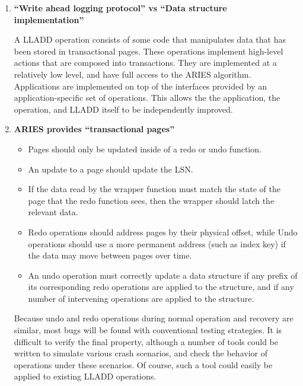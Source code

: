 \documentclass[letterpaper,english]{article}
\begin{document}

\begin{enumerate}

  \item {\bf {}``Write ahead logging protocol'' vs {}``Data structure implementation''}

A LLADD operation consists of some code that manipulates data that has
been stored in transactional pages.  These operations implement
high-level actions that are composed into transactions.  They are
implemented at a relatively low level, and have full access to the
ARIES algorithm.  Applications are implemented on top of the
interfaces provided by an application-specific set of operations.
This allows the the application, the operation, and LLADD itself to be
independently improved. 

  \item {\bf  ARIES provides {}``transactional pages'' }


\begin{itemize}
\item Pages should only be updated inside of a redo or undo function.
\item An update to a page should update the LSN. 
\item If the data read by the wrapper function must match the state of
the page that the redo function sees, then the wrapper should latch
the relevant data.
\item Redo operations should address pages by their physical offset,
while Undo operations should use a more permanent address (such as
index key) if the data may move between pages over time.
\item An undo operation must correctly update a data structure if any
prefix of its corresponding redo operations are applied to the
structure, and if any number of intervening operations are applied to
the structure.
\end{itemize}
Because undo and redo operations during normal operation and recovery
are similar, most bugs will be found with conventional testing
strategies.  It is difficult to verify the final property, although a
number of tools could be written to simulate various crash scenarios,
and check the behavior of operations under these scenarios.  Of course, 
such a tool could easily be applied to existing LLADD operations.


\end{enumerate}
\end{document}
